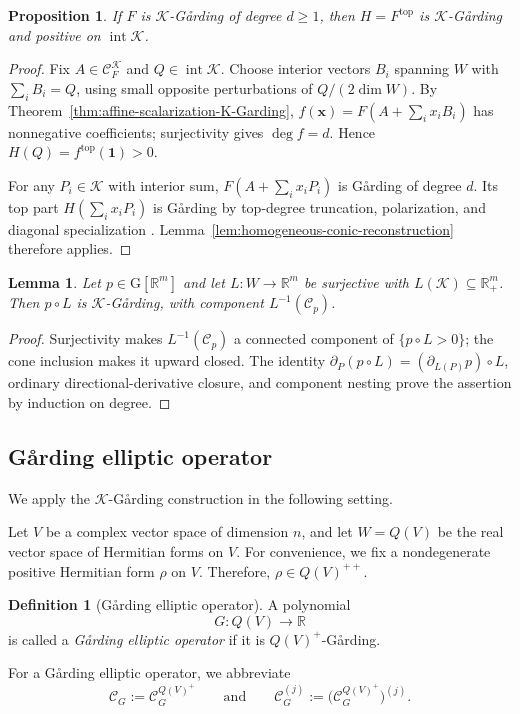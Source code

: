 \documentclass[oneside,english,letterpaper]{amsart}
\numberwithin{equation}{section}
\theoremstyle{plain}
\newtheorem{lem}[thm]{Lemma}
\newtheorem{prop}[thm]{Proposition}
\theoremstyle{definition}
\newtheorem{defn}[thm]{Definition}
\theoremstyle{remark}
\newcommand{\gar}{\ifmmode\mathrm{G\mathring{a}rding}\else G{\aa}rding\fi}
\def\x{\mathbf{x}}
\def\one{\mathbf{1}}
\def\GS{\mathrm G}
\begin{document}
\begin{prop}
\label{prop:conic-top-part}
If $F$ is $\mathcal K$-G{\aa}rding of degree $d\geq1$, then
$H=F^{\mathrm{top}}$ is $\mathcal K$-G{\aa}rding and positive on
$\operatorname{int}\mathcal K$.
\end{prop}
\begin{proof}
Fix $A\in\mathcal C_F^{\mathcal K}$ and $Q\in\operatorname{int}\mathcal K$.
Choose interior vectors $B_i$ spanning $W$ with $\sum_iB_i=Q$,
using small opposite perturbations of $Q/(2\dim W)$.
By Theorem~\ref{thm:affine-scalarization-K-Garding},
$f(\x)=F(A+\sum_i x_iB_i)$ has nonnegative coefficients;
surjectivity gives $\deg f=d$. Hence $H(Q)=f^{\mathrm{top}}(\one)>0$.

For any $P_i\in\mathcal K$ with interior sum,
$F(A+\sum_i x_iP_i)$ is G{\aa}rding of degree $d$.
Its top part $H(\sum_i x_iP_i)$ is G{\aa}rding by top-degree
truncation, polarization, and diagonal specialization
\cite{Fang-MaGard}. Lemma~\ref{lem:homogeneous-conic-reconstruction}
therefore applies.
\end{proof}

\begin{lem}
\label{lem:positive-linear-pullback}
Let $p\in\GS[\mathbb R^m]$ and let $L:W\to\mathbb R^m$ be
surjective with $L(\mathcal K)\subseteq\mathbb R_+^m$.
Then $p\circ L$ is $\mathcal K$-G{\aa}rding, with component
$L^{-1}(\mathcal C_p)$.
\end{lem}
\begin{proof}
Surjectivity makes $L^{-1}(\mathcal C_p)$ a connected component
of $\{p\circ L>0\}$; the cone inclusion makes it upward closed.
The identity
$\partial_P(p\circ L)=(\partial_{L(P)}p)\circ L$,
ordinary directional-derivative closure, and component nesting
prove the assertion by induction on degree.
\end{proof}

\subsection{G{\aa}rding elliptic operator}
We apply the $\mathcal{K}$-\gar{} construction in the following setting.

Let \(V\) be a complex vector space of dimension \(n\), and let \(W=Q(V)\) be the real vector space of Hermitian forms on \(V\). For convenience, we fix a nondegenerate positive Hermitian form \(\rho\) on \(V\). Therefore, $\rho\in Q(V)^{++}$.

\begin{defn}[G{\aa}rding elliptic operator]\label{def:Garding-elliptic-operator}A polynomial\[ G:Q(V)\longrightarrow\mathbb R\]is called a \emph{G{\aa}rding elliptic operator} if it is \(Q(V)^+\)-G{\aa}rding.\end{defn}
For a G{\aa}rding elliptic operator, we abbreviate
\[
\mathcal C_G := \mathcal C_G^{Q(V)^+}
\qquad\text{and}\qquad
\mathcal C_G^{(j)} := \bigl(\mathcal C_G^{Q(V)^+}\bigr)^{(j)}.
\]
\end{document}
